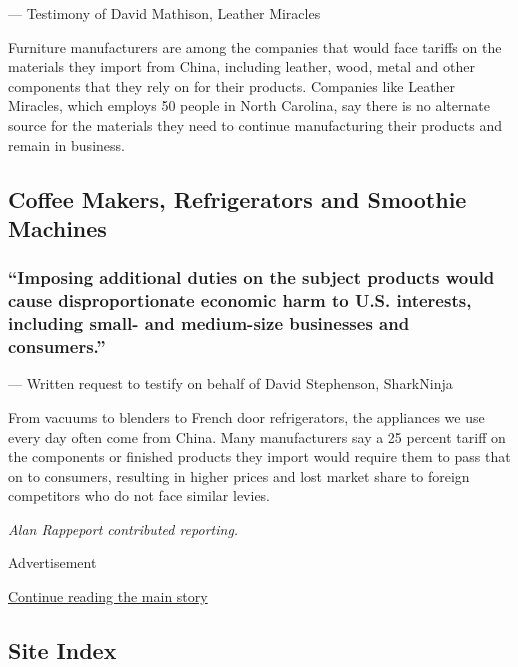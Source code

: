 --- Testimony of David Mathison, Leather Miracles

Furniture manufacturers are among the companies that would face tariffs
on the materials they import from China, including leather, wood, metal
and other components that they rely on for their products. Companies
like Leather Miracles, which employs 50 people in North Carolina, say
there is no alternate source for the materials they need to continue
manufacturing their products and remain in business.

\hypertarget{coffee-makers-refrigerators-and-smoothie-machines}{%
\subsection{Coffee Makers, Refrigerators and Smoothie
Machines}\label{coffee-makers-refrigerators-and-smoothie-machines}}

\hypertarget{imposing-additional-duties-on-the-subject-products-would-cause-disproportionate-economic-harm-to-us-interests-including-small--and-medium-size-businesses-and-consumers}{%
\subsubsection{``Imposing additional duties on the subject products
would cause disproportionate economic harm to U.S. interests, including
small- and medium-size businesses and
consumers.''}\label{imposing-additional-duties-on-the-subject-products-would-cause-disproportionate-economic-harm-to-us-interests-including-small--and-medium-size-businesses-and-consumers}}

--- Written request to testify on behalf of David Stephenson, SharkNinja

From vacuums to blenders to French door refrigerators, the appliances we
use every day often come from China. Many manufacturers say a 25 percent
tariff on the components or finished products they import would require
them to pass that on to consumers, resulting in higher prices and lost
market share to foreign competitors who do not face similar levies.

\emph{Alan Rappeport contributed reporting.}

Advertisement

\protect\hyperlink{after-bottom}{Continue reading the main story}

\hypertarget{site-index}{%
\subsection{Site Index}\label{site-index}}

